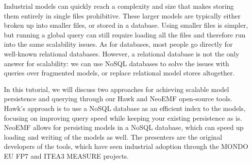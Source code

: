 Industrial models can quickly reach a complexity and size that makes storing
them entirely in single files prohibitive. These larger models are typically
either broken up into smaller files, or stored in a database. Using smaller
files is simpler, but running a global query can still require loading all
the files and therefore run into the same scalability issues. As for databases,
most people go directly for well-known relational databases. However, a
relational database is not the only answer for scalability: we can use NoSQL
databases to solve the issues with queries over fragmented models, or replace
relational model stores altogether.

In this tutorial, we will discuss two approaches for achieving scalable model persistence and querying through our Hawk and NeoEMF open-source tools. Hawk's approach is to use a NoSQL database as an efficient index to the models, focusing on improving query speed while keeping your existing persistence as is. NeoEMF allows for persisting models in a NoSQL database, which can speed up loading and writing of the models as well. The presenters are the original developers of the tools, which have seen industrial adoption through the MONDO EU FP7 and ITEA3 MEASURE projects.